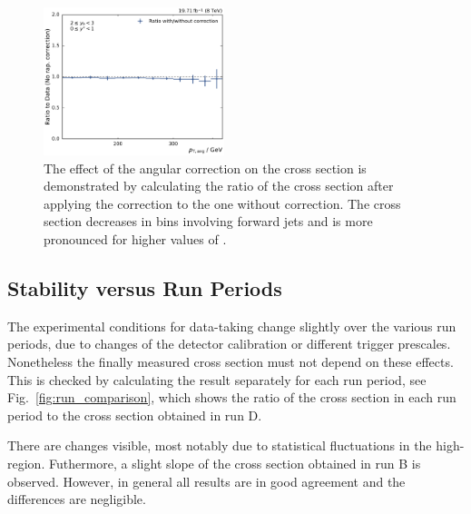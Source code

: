 \begin{figure}[htbp]
    \includegraphics[width=0.47\textwidth]{figures/measurement/rap_corr_data_yb2ys0.pdf}
    \caption[Effect of angular correction]{The effect of the angular correction
        on the cross section  is demonstrated by calculating the ratio of the
        cross section after applying the correction to the one without
        correction. The cross section decreases in bins involving forward jets
        and is more pronounced for higher values of \ystar.}
    \label{fig:rap_corr_data}
\end{figure}

\subsection{Stability versus Run Periods}

The experimental conditions for data-taking change slightly over the various run
periods, due to changes of the detector calibration or different trigger
prescales. Nonetheless the finally measured cross section must not depend on
these effects. This is checked by calculating the result separately for each run
period, see Fig.~\ref{fig:run_comparison}, which shows the ratio of the cross
section in each run period to the cross section obtained in run D. 

There are changes visible, most notably due to statistical fluctuations in the
high-\pt region. Futhermore, a slight slope of the cross section obtained in run
B is observed. However, in general all results are in good agreement and the
differences are negligible.

